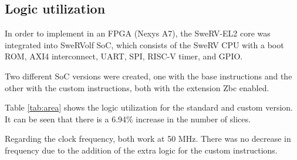 \subsection{Logic utilization} 

In order to implement in an FPGA (Nexys A7), the SweRV-EL2 core was integrated into SweRVolf \cite{swervolf} SoC, 
which consists of the SweRV CPU with a boot ROM, AXI4 interconnect, UART, SPI, \mbox{RISC-V} timer, and GPIO. %

Two different SoC versions were created, one with the base instructions and the other with the custom instructions, 
both with the extension Zbc \cite{swervel2} enabled.

Table \ref{tab:area} shows the logic utilization for the standard and custom version. It can be seen that there is a 6.94\% increase in the 
number of slices.

Regarding the clock frequency, both work at 50 MHz. There was no decrease in frequency due to the addition of the extra logic for the
custom instructions.


